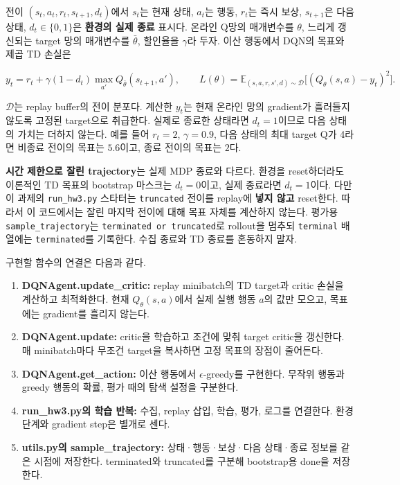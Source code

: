 \documentclass[11pt,a4paper]{article}
\begin{document}
전이 $(s_t,a_t,r_t,s_{t+1},d_t)$에서 $s_t$는 현재 상태, $a_t$는 행동, $r_t$는 즉시 보상, $s_{t+1}$은 다음 상태, $d_t\in\{0,1\}$은 \textbf{환경의 실제 종료} 표시다. 온라인 Q망의 매개변수를 $\theta$, 느리게 갱신되는 target 망의 매개변수를 $\bar\theta$, 할인율을 $\gamma$라 두자. 이산 행동에서 DQN의 목표와 제곱 TD 손실은\par

\[
y_t=r_t+\gamma(1-d_t)\max_{a'}Q_{\bar\theta}(s_{t+1},a'),
\qquad
L(\theta)=\mathbb E_{(s,a,r,s',d)\sim\mathcal D}
\bigl[(Q_\theta(s,a)-y_t)^2\bigr].
\]

$\mathcal D$는 replay buffer의 전이 분포다. 계산한 $y_t$는 현재 온라인 망의 gradient가 흘러들지 않도록 고정된 target으로 취급한다. 실제로 종료한 상태라면 $d_t=1$이므로 다음 상태의 가치는 더하지 않는다. 예를 들어 $r_t=2$, $\gamma=0.9$, 다음 상태의 최대 target Q가 4라면 비종료 전이의 목표는 $5.6$이고, 종료 전이의 목표는 $2$다.\par

\textbf{시간 제한으로 잘린 trajectory}는 실제 MDP 종료와 다르다. 환경을 reset하더라도 이론적인 TD 목표의 bootstrap 마스크는 $d_t=0$이고, 실제 종료라면 $d_t=1$이다. 다만 이 과제의 \texttt{run\_\allowbreak{}hw3.\allowbreak{}py} 스타터는 \texttt{truncated} 전이를 replay에 \textbf{넣지 않고} reset한다. 따라서 이 코드에서는 잘린 마지막 전이에 대해 목표 자체를 계산하지 않는다. 평가용 \texttt{sample\_\allowbreak{}trajectory}는 \texttt{terminated or truncated}로 rollout을 멈추되 \texttt{terminal} 배열에는 \texttt{terminated}를 기록한다. 수집 종료와 TD 종료를 혼동하지 말자.\par

구현할 함수의 연결은 다음과 같다.\par

\begin{enumerate}
\item \textbf{DQNAgent.update\_critic:} replay minibatch의 TD target과 critic 손실을 계산하고 최적화한다. 현재 $Q_\theta(s,a)$에서 실제 실행 행동 $a$의 값만 모으고, 목표에는 gradient를 흘리지 않는다.
\item \textbf{DQNAgent.update:} critic을 학습하고 조건에 맞춰 target critic을 갱신한다. 매 minibatch마다 무조건 target을 복사하면 고정 목표의 장점이 줄어든다.
\item \textbf{DQNAgent.get\_action:} 이산 행동에서 $\epsilon$-greedy를 구현한다. 무작위 행동과 greedy 행동의 확률, 평가 때의 탐색 설정을 구분한다.
\item \textbf{run\_hw3.py의 학습 반복:} 수집, replay 삽입, 학습, 평가, 로그를 연결한다. 환경 단계와 gradient step은 별개로 센다.
\item \textbf{utils.py의 sample\_trajectory:} 상태·행동·보상·다음 상태·종료 정보를 같은 시점에 저장한다. terminated와 truncated를 구분해 bootstrap용 done을 저장한다.
\end{enumerate}
\end{document}
